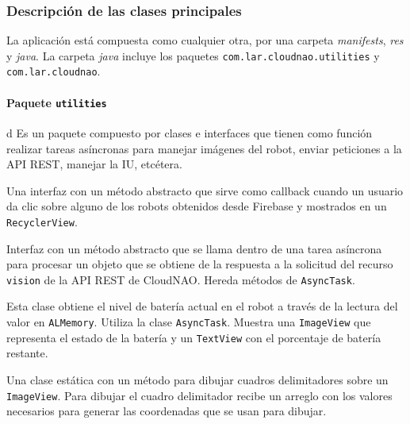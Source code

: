 \subsubsection{Descripción de las clases principales}
\label{\detokenize{dev_docs:documentacion-para-desarrolladores}}

La aplicación está compuesta como cualquier otra, por una
carpeta \textit{manifests}, \textit{res} y \textit{java}.
La carpeta \textit{java} incluye los paquetes \texttt{com.lar.cloudnao.utilities} y \texttt{com.lar.cloudnao}.


\paragraph{Paquete \texttt{utilities}}
d
Es un paquete compuesto por clases e interfaces que tienen como
función realizar tareas asíncronas para manejar imágenes del robot,
enviar peticiones a la API REST, manejar la IU, etcétera.


Una interfaz con un método abstracto que sirve como callback
cuando un usuario da clic sobre alguno de los robots obtenidos desde Firebase y mostrados en un \texttt{RecyclerView}.


Interfaz con un método abstracto que se llama dentro de una tarea asíncrona para procesar un objeto que se obtiene de la respuesta
a la solicitud del recurso \texttt{vision} de la API REST de CloudNAO.
Hereda métodos de \texttt{AsyncTask}.


Esta clase obtiene el nivel de batería actual en el robot a través de la lectura del valor en 
\texttt{ALMemory}. Utiliza la clase \texttt{AsyncTask}.
Muestra una \texttt{ImageView} que representa el estado de la batería y un \texttt{TextView} con el porcentaje de batería restante.


Una clase estática con un método para dibujar cuadros delimitadores 
sobre un \texttt{ImageView}. Para dibujar el cuadro delimitador 
recibe un arreglo con los valores necesarios para generar las 
coordenadas que se usan para dibujar.


